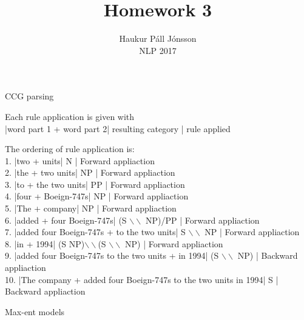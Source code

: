 \documentclass[12pt]{article}
\newenvironment{question}[2][Question]{\begin{trivlist}
\item[\hskip \labelsep {\bfseries #1}\hskip \labelsep {\bfseries #2.}]}{\end{trivlist}}
\newenvironment{answer}[2][Answer]{\begin{trivlist}
\item[\hskip \labelsep {\bfseries #1}\hskip \labelsep {\bfseries #2:}]}{\end{trivlist}}
\begin{document}
\renewcommand{\theenumi}{\roman{enumi}}

\let\oldsum\sum
\renewcommand{\sum}[3]{\oldsum\limits_{#1}^{#2}#3}
\let\oldprod\prod
\renewcommand{\prod}[3]{\oldprod\limits_{#1}^{#2}#3}


\title{Homework 3}
\author{Haukur Páll Jónsson\\
NLP 2017}

\maketitle

\begin{question}{1}
CCG parsing
\end{question}
\begin{answer}{a)}{}

Each rule application is given with \\
|word part 1 + word part 2| resulting category | rule applied

The ordering of rule application is:\\
1. |two + units| N | Forward appliaction \\
2. |the + two units| NP | Forward appliaction \\
3. |to + the two units| PP | Forward appliaction \\
4. |four + Boeign-747s| NP | Forward appliaction \\
5. |The + company| NP | Forward appliaction \\
6. |added + four Boeign-747s| (S $\backslash\backslash$ NP)/PP | Forward appliaction \\
7. |added four Boeign-747s + to the two units| S $\backslash\backslash$ NP | Forward appliaction \\
8. |in + 1994| (S  NP)$\backslash\backslash$(S $\backslash\backslash$ NP) | Forward appliaction \\
9. |added four Boeign-747s to the two units + in 1994| (S $\backslash\backslash$ NP) | Backward appliaction \\
10. |The company + added four Boeign-747s to the two units in 1994| S | Backward appliaction \\
\end{answer}

\begin{question}{2}
Max-ent models
\end{question}
\end{document}

